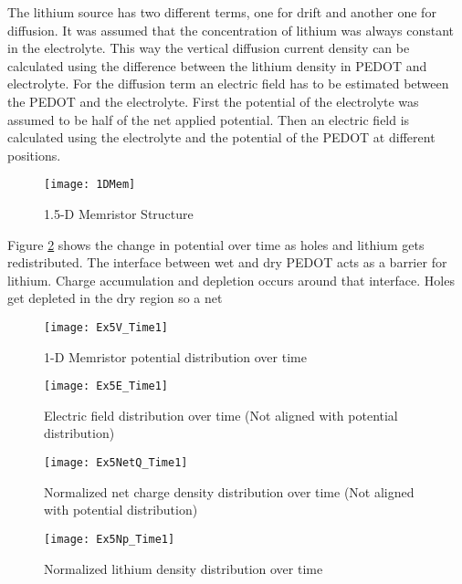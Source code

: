 The lithium source has two different terms, one for drift and another one for diffusion. It was assumed that the concentration of lithium was always constant in the electrolyte. This way the vertical diffusion current density can be calculated using the difference between the lithium density in PEDOT and electrolyte. For the diffusion term an electric field has to be estimated between the PEDOT and the electrolyte. First the potential of the electrolyte was assumed to be half of the net applied potential. Then an electric field is calculated using the electrolyte and the potential of the PEDOT at different positions.
  
\begin{figure}[!htp]
\centering
\texttt{[image: 1DMem]}
\caption{1.5-D Memristor Structure} 
\label{MemStc15}
\end{figure}

Figure \ref{MemV} shows the change in potential over time as holes and lithium gets redistributed. The interface between wet and dry PEDOT acts as a barrier for lithium. Charge accumulation and depletion occurs around that interface. Holes get depleted in the dry region so a net 


\begin{landscape}
\begin{figure}[!htp]
\centering
\texttt{[image: Ex5V\_Time1]}
\caption{1-D Memristor potential distribution over time} 
\label{MemV}
\end{figure}
\end{landscape}

\begin{landscape}
\begin{figure}[!htp]
\centering
\texttt{[image: Ex5E\_Time1]}
\caption{Electric field distribution over time (Not aligned with potential distribution) } 
\label{MemE}
\end{figure}
\end{landscape}


\begin{landscape}
\begin{figure}[!htp]
\centering
\texttt{[image: Ex5NetQ\_Time1]}
\caption{Normalized net charge density distribution over time (Not aligned with potential distribution) } 
\label{}
\end{figure}
\end{landscape}


\begin{landscape}
\begin{figure}[!htp]
\centering
\texttt{[image: Ex5Np\_Time1]}
\caption{Normalized lithium density distribution over time} 
\label{}
\end{figure}
\end{landscape}


